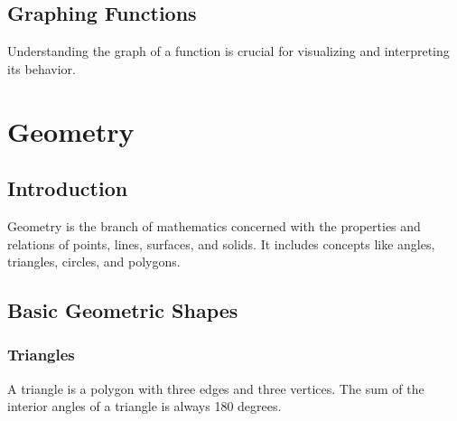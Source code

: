 \documentclass[a4paper,twoside,11pt]{book}
\newcommand{\chaptercolor}{}
\newcommand{\chaptercolors}[1]{%
  \ifcase#1%
    \renewcommand{\chaptercolor}{cyan!20!white}\or %
    \renewcommand{\chaptercolor}{red!20!white}\or  %
    \renewcommand{\chaptercolor}{yellow!20!white}\or %
    \renewcommand{\chaptercolor}{brown!20!white}  %
  \else
    \renewcommand{\chaptercolor}{white}
  \fi
}
\begin{document}
\section{Graphing Functions}
Understanding the graph of a function is crucial for visualizing and interpreting its behavior.

\begin{center}
\end{center}

\chapter{Geometry}
\chaptercolors{4}
\section{Introduction}
Geometry is the branch of mathematics concerned with the properties and relations of points, lines, surfaces, and solids. It includes concepts like angles, triangles, circles, and polygons.

\section{Basic Geometric Shapes}
\subsection{Triangles}
A triangle is a polygon with three edges and three vertices. The sum of the interior angles of a triangle is always 180 degrees.
\end{document}
